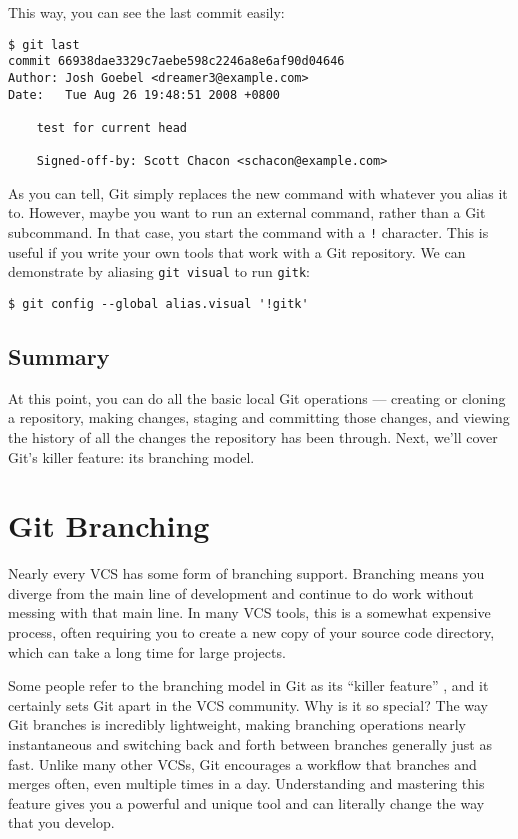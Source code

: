 \documentclass[a4paper]{book}
\newcommand{\chap}[1]{\newpage\thispagestyle{empty}\chapter{#1}\label{chap:\thechapter}}
\begin{document}
This way, you can see the last commit easily:

\begin{shaded}\begin{verbatim}
$ git last
commit 66938dae3329c7aebe598c2246a8e6af90d04646
Author: Josh Goebel <dreamer3@example.com>
Date:   Tue Aug 26 19:48:51 2008 +0800

    test for current head

    Signed-off-by: Scott Chacon <schacon@example.com>
\end{verbatim}\end{shaded}

As you can tell, Git simply replaces the new command with whatever you alias it to. However, maybe you want to run an external command, rather than a Git subcommand. In that case, you start the command with a \texttt{!} character. This is useful if you write your own tools that work with a Git repository. We can demonstrate by aliasing \texttt{git visual} to run \texttt{gitk}:

\begin{shaded}\begin{verbatim}
$ git config --global alias.visual '!gitk'
\end{verbatim}\end{shaded}

\section{Summary}

At this point, you can do all the basic local Git operations --- creating or cloning a repository, making changes, staging and committing those changes, and viewing the history of all the changes the repository has been through. Next, we'll cover Git's killer feature: its branching model.

\chap{Git Branching}

Nearly every VCS has some form of branching support. Branching means you diverge from the main line of development and continue to do work without messing with that main line. In many VCS tools, this is a somewhat expensive process, often requiring you to create a new copy of your source code directory, which can take a long time for large projects.

Some people refer to the branching model in Git as its “killer feature” , and it certainly sets Git apart in the VCS community. Why is it so special? The way Git branches is incredibly lightweight, making branching operations nearly instantaneous and switching back and forth between branches generally just as fast. Unlike many other VCSs, Git encourages a workflow that branches and merges often, even multiple times in a day. Understanding and mastering this feature gives you a powerful and unique tool and can literally change the way that you develop.
\end{document}
